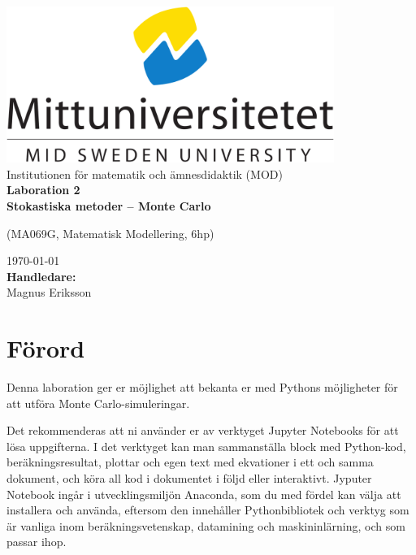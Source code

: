 \documentclass[a4paper]{article}
\newcommand{\gettitle}{Laboration 2 \\ Stokastiska metoder -- Monte Carlo} %
\newcommand{\getcourse}{(MA069G, Matematisk Modellering, 6hp)} %
\newcommand{\getsupervisor}{Magnus Eriksson}
\begin{document}
\begin{titlepage}
    \begin{center}
        \vspace*{1cm}
        \includegraphics[width=0.8\textwidth]{msu.png}\\[0.5cm]
        \Large
        Institutionen för matematik och ämnesdidaktik (MOD)\\[1cm]
        \Huge
        \textbf{\gettitle}

        \large
        \getcourse{}

        \vspace{1cm}

        \Large
        \vfill
        \vspace{0.8cm}
        \small
        \today \\
        \Large
        \textbf{Handledare:}\\
        \getsupervisor{}
    \end{center}
\end{titlepage}

\tableofcontents
\newpage

\section{Förord}
Denna laboration ger er möjlighet att bekanta er med Pythons
möjligheter för att utföra Monte Carlo-simuleringar.

Det rekommenderas att ni använder er av verktyget Jupyter Notebooks för att lösa
uppgifterna. I det verktyget kan man sammanställa block med Python-kod, beräkningsresultat,
plottar och egen text med ekvationer i ett och samma dokument, och köra all kod i dokumentet
i följd eller interaktivt. Jyputer Notebook ingår i utvecklingsmiljön Anaconda, som du med
fördel kan välja att installera och använda, eftersom den innehåller Pythonbibliotek och
verktyg som är vanliga inom beräkningsvetenskap, datamining och maskininlärning, och som passar ihop.
\end{document}
